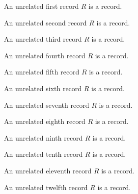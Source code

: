 

\begin{struct}\label{unrelated_record_0}
    An unrelated first record $R$ is a record.
\end{struct}

\begin{struct}\label{unrelated_record_1}
    An unrelated second record $R$ is a record.
\end{struct}

\begin{struct}\label{unrelated_record_2}
    An unrelated third record $R$ is a record.
\end{struct}

\begin{struct}\label{unrelated_record_3}
    An unrelated fourth record $R$ is a record.
\end{struct}

\begin{struct}\label{unrelated_record_4}
    An unrelated fifth record $R$ is a record.
\end{struct}

\begin{struct}\label{unrelated_record_5}
    An unrelated sixth record $R$ is a record.
\end{struct}

\begin{struct}\label{unrelated_record_6}
    An unrelated seventh record $R$ is a record.
\end{struct}

\begin{struct}\label{unrelated_record_7}
    An unrelated eighth record $R$ is a record.
\end{struct}

\begin{struct}\label{unrelated_record_8}
    An unrelated ninth record $R$ is a record.
\end{struct}

\begin{struct}\label{unrelated_record_9}
    An unrelated tenth record $R$ is a record.
\end{struct}

\begin{struct}\label{unrelated_record_10}
    An unrelated eleventh record $R$ is a record.
\end{struct}

\begin{struct}\label{unrelated_record_11}
    An unrelated twelfth record $R$ is a record.
\end{struct}

